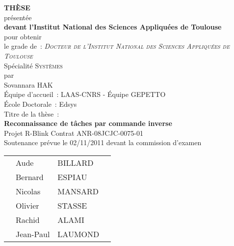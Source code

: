 



\thispagestyle{empty}
\begin{center}
  {\LARGE 
\textbf{THÈSE}\\[\baselineskip]
  }
  présentée\\[\baselineskip]
  {\Large
\textbf{devant l'Institut National des Sciences Appliquées de Toulouse}\\[\baselineskip]
  }
  pour obtenir\\[\baselineskip]
  {\large 
le grade de~: \emph{\textsc{Docteur de l'Institut National des Sciences Appliquées de Toulouse}}\\
Sp\'ecialit\'e \textsc{Systèmes}\\[\baselineskip]
  }
  par\\[\baselineskip]
  {\large 
Sovannara HAK\\[\baselineskip]
  }
Équipe d'accueil~: LAAS-CNRS - Équipe {\sc GEPETTO}\\
École Doctorale~: Edsys\\
  Titre de la thèse~:\\[\baselineskip]
  {\LARGE     \textbf{   Reconnaissance de t\^aches par commande inverse\\}}
  \vfill
  Projet R-Blink Contrat ANR-08JCJC-0075-01\\
  \vfill
  Soutenance prévue le 02/11/2011 devant la commission d'examen\\[\baselineskip]
\end{center}

\begin{center}
\begin{tabular}{r@{\protect\hspace{0.5cm}}ll@{\protect\hspace{1.0cm}}l}
&Aude&BILLARD\\
&Bernard&ESPIAU\\
&Nicolas&MANSARD\\
&Olivier&STASSE\\
&Rachid&ALAMI\\%
&Jean-Paul&LAUMOND\\

\end{tabular}
\end{center}


